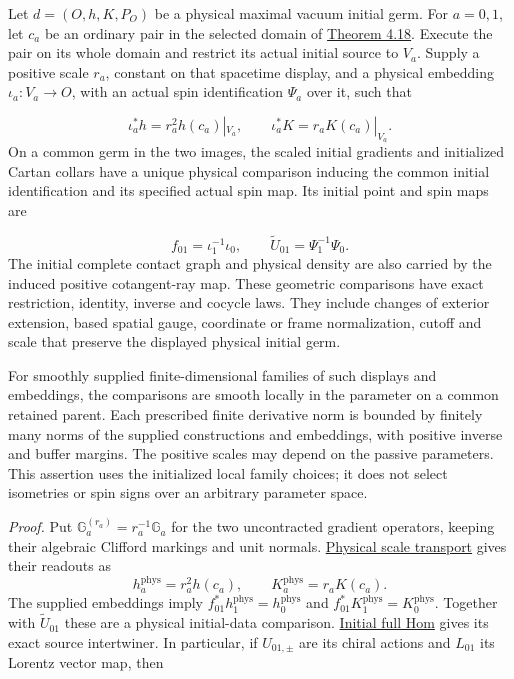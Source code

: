 \documentclass[
  english,
  11pt,
  reqno]{amsart}
\begin{document}
Let \(d=(O,h,K,P_O)\) be a physical maximal vacuum initial germ. For
\(a=0,1\), let \(c_a\) be an ordinary pair in the selected domain of
\hyperref[thm:online-ordinary-negative-response-initial-source]{Theorem
4.18}. Execute the pair on its whole domain and restrict its actual
initial source to \(V_a\). Supply a positive scale \(r_a\), constant on
that spacetime display, and a physical embedding \(\iota_a:V_a\to O\),
with an actual spin identification \(\Psi_a\) over it, such that

\label{eq:online-fixed-slice-physical-embeddings} \[
\iota_a^*h=r_a^2h(c_a)|_{V_a},\qquad
\iota_a^*K=r_aK(c_a)|_{V_a}.
\] On a common germ in the two images, the scaled initial gradients and
initialized Cartan collars have a unique physical comparison inducing
the common initial identification and its specified actual spin map. Its
initial point and spin maps are

\label{eq:online-fixed-slice-comparison-from-markings} \[
f_{01}=\iota_1^{-1}\iota_0,\qquad
\widetilde U_{01}=\Psi_1^{-1}\Psi_0.
\] The initial complete contact graph and physical density are also
carried by the induced positive cotangent-ray map. These geometric
comparisons have exact restriction, identity, inverse and cocycle laws.
They include changes of exterior extension, based spatial gauge,
coordinate or frame normalization, cutoff and scale that preserve the
displayed physical initial germ.

For smoothly supplied finite-dimensional families of such displays and
embeddings, the comparisons are smooth locally in the parameter on a
common retained parent. Each prescribed finite derivative norm is
bounded by finitely many norms of the supplied constructions and
embeddings, with positive inverse and buffer margins. The positive
scales may depend on the passive parameters. This assertion uses the
initialized local family choices; it does not select isometries or spin
signs over an arbitrary parameter space.

\emph{Proof.} Put \(\mathbb G_a^{(r_a)}=r_a^{-1}\mathbb G_a\) for the
two uncontracted gradient operators, keeping their algebraic Clifford
markings and unit normals.
\hyperref[prop:online-cartan-physical-scale]{Physical scale transport}
gives their readouts as \[
h_a^{\mathrm{phys}}=r_a^2h(c_a),\qquad
K_a^{\mathrm{phys}}=r_aK(c_a).
\] The supplied embeddings imply
\(f_{01}^*h_1^{\mathrm{phys}}=h_0^{\mathrm{phys}}\) and
\(f_{01}^*K_1^{\mathrm{phys}}=K_0^{\mathrm{phys}}\). Together with
\(\widetilde U_{01}\) these are a physical initial-data comparison.
\hyperref[thm:online-initial-gradient-full-hom]{Initial full Hom} gives
its exact source intertwiner. In particular, if \(U_{01,\pm}\) are its
chiral actions and \(L_{01}\) its Lorentz vector map, then
\end{document}
